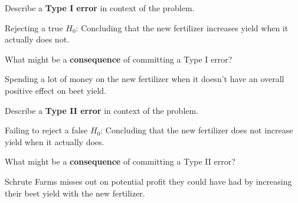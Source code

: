 \documentclass[noanswers]{exam}
\begin{document}
\begin{questions}
\question Describe a \textbf{Type I error} in context of the problem.

\begin{solution}[\stretch{1}]

\vspace{1mm}

Rejecting a true $H_0$: Concluding that the new fertilizer increases yield when it actually does not.

\vspace{1mm}

\end{solution}

\question What might be a \textbf{consequence} of committing a Type I error?

\begin{solution}[\stretch{1}]

\vspace{1mm}

Spending a lot of money on the new fertilizer when it doesn't have an overall positive effect on beet yield.

\vspace{1mm}

\end{solution}

\question Describe a \textbf{Type II error} in context of the problem.

\begin{solution}[\stretch{1}]

\vspace{1mm}

Failing to reject a false $H_0$: Concluding that the new fertilizer does not increase yield when it actually does.

\vspace{1mm}

\end{solution}

\question What might be a \textbf{consequence} of committing a Type II error?

\begin{solution}[\stretch{1}]

\vspace{1mm}

Schrute Farms misses out on potential profit they could have had by increasing their beet yield with the new fertilizer.

\vspace{1mm}

\end{solution}


\end{questions}
\end{document}
